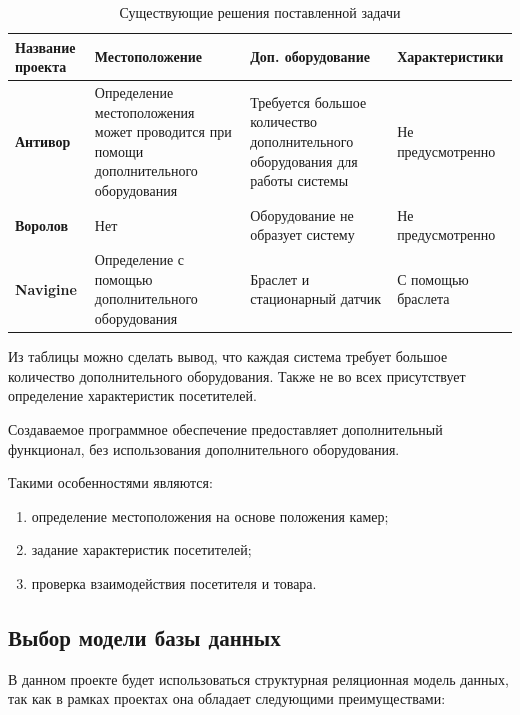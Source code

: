 \begin{table}[ht!]
	\centering
	\caption{Существующие решения поставленной задачи}
	\label{decisions}
	\begin{tabular}{|p{2.6cm}|p{5cm}|p{4cm}|p{4cm}|}
			\hline
			\textbf{Название проекта} & \textbf{Местоположение} & \textbf{Доп. оборудование} & \textbf{Характеристики}\\
			\hline
			\textbf{Антивор \cite{Antivor}} & Определение местоположения может проводится при помощи дополнительного оборудования 
			& Требуется большое количество дополнительного оборудования для работы системы
			 & Не предусмотренно\\
			\hline

			\textbf{Воролов \cite{VOROLOV}} & Нет 
			& Оборудование не образует систему
			 & Не предусмотренно\\
			\hline

			\textbf{Navigine \cite{Navigine}} & Определение с помощью дополнительного оборудования 
			& Браслет и стационарный датчик
			 & С помощью браслета\\
			\hline
	\end{tabular}
\end{table}


Из таблицы можно сделать вывод, что каждая система требует большое количество дополнительного оборудования.
Также не во всех присутствует определение характеристик посетителей.

Создаваемое программное обеспечение предоставляет дополнительный функционал, без использования дополнительного оборудования.

Такими особенностями являются:

\begin{enumerate}[label=\arabic*.]
	\item определение местоположения на основе положения камер;
	\item задание характеристик посетителей;
	\item проверка взаимодействия посетителя и товара.
\end{enumerate}

\subsection{Выбор модели базы данных}

В данном проекте будет использоваться структурная реляционная модель данных, так как в рамках проектах
она обладает следующими преимуществами:


